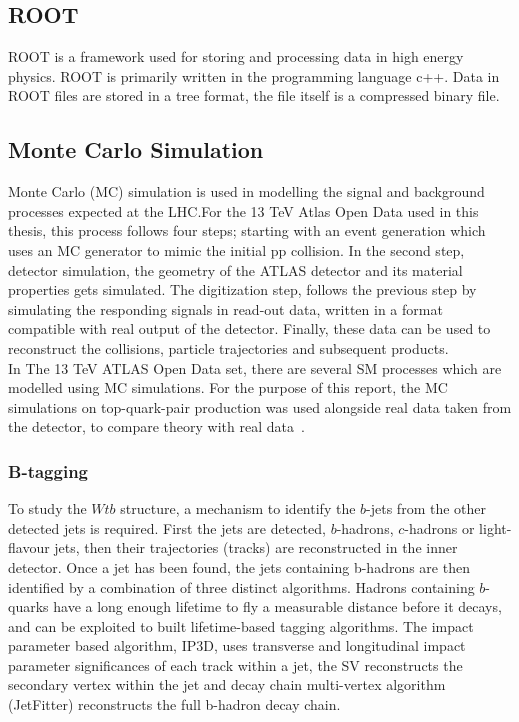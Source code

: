\documentclass[12pt,a4paper]{article}
\numberwithin{equation}{section}
\begin{document}
\subsection{ROOT}
ROOT is a framework used for storing and processing data in high energy physics.
ROOT is primarily written in the programming language c++. Data in ROOT files
are stored in a tree format, the file itself is a compressed binary
file.\cite{root}


\subsection{Monte Carlo Simulation}
Monte Carlo (MC) simulation is used in modelling the signal and background
processes expected at the LHC.\@ For the 13 TeV Atlas Open Data used in this
thesis, this process follows four steps; starting with an event generation which
uses an MC generator to mimic the initial pp collision. In the second step,
detector simulation, the geometry of the ATLAS detector and its material
properties gets simulated. The digitization step, follows the previous step by
simulating the responding signals in read-out data, written in a format
compatible with real output of the detector. Finally, these data can be used to
reconstruct the collisions, particle trajectories and subsequent
products.\\

In The 13 TeV ATLAS Open Data set, there are several SM processes which are
modelled using MC simulations. For the purpose of this report, the MC
simulations on top-quark-pair production was used alongside real data taken from
the detector, to compare theory with real data~\cite{mcopenatlas}.



\subsubsection{B-tagging}
To study the $Wtb$ structure, a mechanism to identify the $b$-jets from the
other detected jets is required. First the jets are detected, $b$-hadrons,
$c$-hadrons or light-flavour jets, then their trajectories (tracks) are
reconstructed in the inner detector. Once a jet has been found, the jets
containing b-hadrons are then identified by a combination of three distinct
algorithms. Hadrons containing $b$-quarks have a long enough lifetime to fly a
measurable distance before it decays, and can be exploited to built
lifetime-based tagging algorithms. The impact parameter based algorithm, IP3D,
uses transverse and longitudinal impact parameter significances of each track
within a jet, the SV reconstructs the secondary vertex within the jet and decay
chain multi-vertex algorithm (JetFitter) reconstructs the full b-hadron
decay chain.\\
\end{document}
